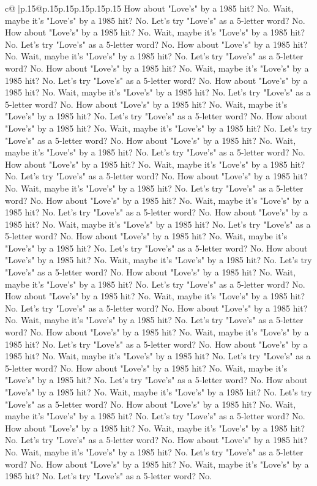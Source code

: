 \documentclass{article}
\begin{document}
{\begin{supertabular}{c@{$\;$}|p{.15\linewidth}@{}p{.15\linewidth}p{.15\linewidth}p{.15\linewidth}p{.15\linewidth}p{.15\linewidth}}
{{{How about "Love's" by a 1985 hit? No. Wait, maybe it's "Love's" by a 1985 hit? No. Let's try "Love's" as a 5{-}letter word? No. How about "Love's" by a 1985 hit? No. Wait, maybe it's "Love's" by a 1985 hit? No. Let's try "Love's" as a 5{-}letter word? No. How about "Love's" by a 1985 hit? No. Wait, maybe it's "Love's" by a 1985 hit? No. Let's try "Love's" as a 5{-}letter word? No. How about "Love's" by a 1985 hit? No. Wait, maybe it's "Love's" by a 1985 hit? No. Let's try "Love's" as a 5{-}letter word? No. How about "Love's" by a 1985 hit? No. Wait, maybe it's "Love's" by a 1985 hit? No. Let's try "Love's" as a 5{-}letter word? No. How about "Love's" by a 1985 hit? No. Wait, maybe it's "Love's" by a 1985 hit? No. Let's try "Love's" as a 5{-}letter word? No. How about "Love's" by a 1985 hit? No. Wait, maybe it's "Love's" by a 1985 hit? No. Let's try "Love's" as a 5{-}letter word? No. How about "Love's" by a 1985 hit? No. Wait, maybe it's "Love's" by a 1985 hit? No. Let's try "Love's" as a 5{-}letter word? No. How about "Love's" by a 1985 hit? No. Wait, maybe it's "Love's" by a 1985 hit? No. Let's try "Love's" as a 5{-}letter word? No. How about "Love's" by a 1985 hit? No. Wait, maybe it's "Love's" by a 1985 hit? No. Let's try "Love's" as a 5{-}letter word? No. How about "Love's" by a 1985 hit? No. Wait, maybe it's "Love's" by a 1985 hit? No. Let's try "Love's" as a 5{-}letter word? No. How about "Love's" by a 1985 hit? No. Wait, maybe it's "Love's" by a 1985 hit? No. Let's try "Love's" as a 5{-}letter word? No. How about "Love's" by a 1985 hit? No. Wait, maybe it's "Love's" by a 1985 hit? No. Let's try "Love's" as a 5{-}letter word? No. How about "Love's" by a 1985 hit? No. Wait, maybe it's "Love's" by a 1985 hit? No. Let's try "Love's" as a 5{-}letter word? No. How about "Love's" by a 1985 hit? No. Wait, maybe it's "Love's" by a 1985 hit? No. Let's try "Love's" as a 5{-}letter word? No. How about "Love's" by a 1985 hit? No. Wait, maybe it's "Love's" by a 1985 hit? No. Let's try "Love's" as a 5{-}letter word? No. How about "Love's" by a 1985 hit? No. Wait, maybe it's "Love's" by a 1985 hit? No. Let's try "Love's" as a 5{-}letter word? No. How about "Love's" by a 1985 hit? No. Wait, maybe it's "Love's" by a 1985 hit? No. Let's try "Love's" as a 5{-}letter word? No. How about "Love's" by a 1985 hit? No. Wait, maybe it's "Love's" by a 1985 hit? No. Let's try "Love's" as a 5{-}letter word? No. How about "Love's" by a 1985 hit? No. Wait, maybe it's "Love's" by a 1985 hit? No. Let's try "Love's" as a 5{-}letter word? No. How about "Love's" by a 1985 hit? No. Wait, maybe it's "Love's" by a 1985 hit? No. Let's try "Love's" as a 5{-}letter word? No. How about "Love's" by a 1985 hit? No. Wait, maybe it's "Love's" by a 1985 hit? No. Let's try "Love's" as a 5{-}letter word? No. How about "Love's" by a 1985 hit? No. Wait, maybe it's "Love's" by a 1985 hit? No. Let's try "Love's" as a 5{-}letter word? No. How about "Love's" by a 1985 hit? No. Wait, maybe it's "Love's" by a 1985 hit? No. Let's try "Love's" as a 5{-}letter word? No. How about "Love's" by a 1985 hit? No. Wait, maybe it's "Love's" by a 1985 hit? No. Let's try "Love's" as a 5{-}letter word? No. }}}
\end{supertabular}}
\end{document}
